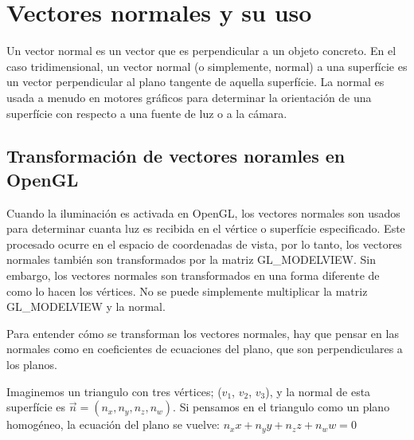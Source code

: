 \chapter{Vectores normales y su uso}
Un vector normal es un vector que es perpendicular a un objeto concreto. En el caso tridimensional, un vector normal (o simplemente, normal) a una superfície es un vector perpendicular al plano tangente de aquella superfície. La normal es usada a menudo en motores gráficos para determinar la orientación de una superfície con respecto a una fuente de luz o a la cámara.
\begin{figure} [h!]
  \centering
\end{figure}

\section {Transformación de vectores noramles en OpenGL}
Cuando la iluminación es activada en OpenGL, los vectores normales son usados para determinar cuanta luz es recibida en el vértice o superfície especificado. Este procesado ocurre en el espacio de coordenadas de vista, por lo tanto, los vectores normales también son transformados por la matriz GL\_MODELVIEW.
Sin embargo, los vectores normales son transformados en una forma diferente de como lo hacen los vértices. No se puede simplemente multiplicar la matriz GL\_MODELVIEW y la normal.

Para entender cómo se transforman los vectores normales, hay que pensar en las normales como en coeficientes de ecuaciones del plano, que son perpendiculares a los planos.

Imaginemos un triangulo con tres vértices; ($v_1$, $v_2$, $v_3$), y la normal de esta superfície es $\vec{n} = (n_x, n_y, n_z, n_w)$. Si pensamos en el triangulo como un plano homogéneo, la ecuación del plano se vuelve: $n_xx + n_yy + n_zz + n_ww = 0$

